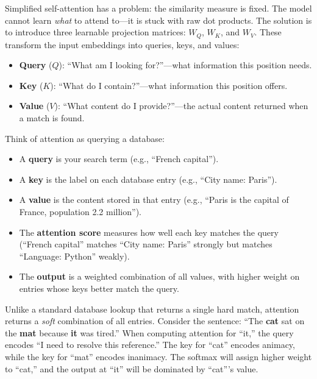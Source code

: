 Simplified self-attention has a problem: the similarity measure is fixed.
The model cannot learn \emph{what} to attend to---it is stuck with raw dot
products. The solution is to introduce three learnable projection matrices:
$W_Q$, $W_K$, and $W_V$. These transform the input embeddings into queries,
keys, and values:

\begin{itemize}
  \item \textbf{Query} ($Q$): ``What am I looking for?''---what information this
        position needs.
  \item \textbf{Key} ($K$): ``What do I contain?''---what information this
        position offers.
  \item \textbf{Value} ($V$): ``What content do I provide?''---the actual
        content returned when a match is found.
\end{itemize}

\begin{keyconcept}
  Think of attention as querying a database:
  \begin{itemize}
    \item A \textbf{query} is your search term (e.g., ``French capital'').
    \item A \textbf{key} is the label on each database entry (e.g., ``City name: Paris'').
    \item A \textbf{value} is the content stored in that entry (e.g., ``Paris is the capital of France, population 2.2 million'').
    \item The \textbf{attention score} measures how well each key matches the query
          (``French capital'' matches ``City name: Paris'' strongly but matches
          ``Language: Python'' weakly).
    \item The \textbf{output} is a weighted combination of all values, with higher
          weight on entries whose keys better match the query.
  \end{itemize}
  Unlike a standard database lookup that returns a single hard match, attention
  returns a \emph{soft} combination of all entries. Consider the sentence:
  ``The \textbf{cat} sat on the \textbf{mat} because \textbf{it} was tired.''
  When computing attention for ``it,'' the query encodes ``I need to resolve
  this reference.'' The key for ``cat'' encodes animacy, while the key for
  ``mat'' encodes inanimacy. The softmax will assign higher weight to ``cat,''
  and the output at ``it'' will be dominated by ``cat'''s value.
\end{keyconcept}

